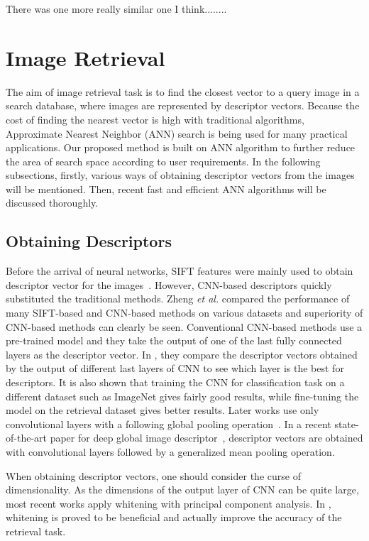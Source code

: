There was one more really similar one I think........

\section{Image Retrieval}

The aim of image retrieval task is to find the closest vector to a query image in a search database, where images are represented by descriptor vectors.
Because the cost of finding the nearest vector is high with traditional algorithms, Approximate Nearest Neighbor (ANN) search is being used for many practical applications.
Our proposed method is built on ANN algorithm to further reduce the area of search space according to user requirements. 
In the following subsections, firstly, various ways of obtaining descriptor vectors from the images will be mentioned. 
Then, recent fast and efficient ANN algorithms will be discussed thoroughly. 

\subsection{Obtaining Descriptors}

Before the arrival of neural networks, SIFT features were mainly used to obtain descriptor vector for the images~\cite{philbin2007object}\cite{jegou2010aggregating}. 
However, CNN-based descriptors quickly substituted the traditional methods. 
Zheng \emph{et al.} compared the performance of many SIFT-based and CNN-based methods on various datasets and superiority of CNN-based methods can clearly be seen. 
Conventional CNN-based methods use a pre-trained model and they take the output of one of the last fully connected layers as the descriptor vector. 
In \cite{babenko2014neural}, they compare the descriptor vectors obtained by the output of different last layers of CNN to see which layer is the best for descriptors.
It is also shown that training the CNN for classification task on a different dataset such as ImageNet gives fairly good results, while fine-tuning the model on the retrieval dataset gives better results.
Later works use only convolutional layers with a following global pooling operation~\cite{razavian2016visual}\cite{tolias2015particular}. 
In a recent state-of-the-art paper for deep global image descriptor~\cite{radenovic2018fine}, descriptor vectors are obtained with convolutional layers followed by a generalized mean pooling operation.

When obtaining descriptor vectors, one should consider the curse of dimensionality. 
As the dimensions of the output layer of CNN can be quite large, most recent works apply whitening with principal component analysis. 
In \cite{jegou2012negative}, whitening is proved to be beneficial and actually improve the accuracy of the retrieval task.

